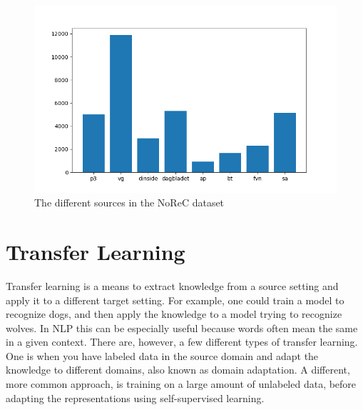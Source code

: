 \documentclass{report}
\begin{document}
\begin{figure}[h!]
	\centering
	\includegraphics[scale=0.5]{img/src_dist}
	\caption{The different sources in the NoReC dataset}
	\label{fig:sources}
\end{figure}%



\section{Transfer Learning}
Transfer learning is a means to extract knowledge from a source setting and apply it to a different target setting. For example, one could train a model to recognize dogs, and then apply the knowledge to a model trying to recognize wolves. In NLP this can be especially useful because words often mean the same in a given context. There are, however, a few different types of transfer learning. One is when you have labeled data in the source domain and adapt the knowledge to different domains, also known as domain adaptation. A different, more common approach, is training on a large amount of unlabeled data, before adapting the representations using self-supervised learning.
\end{document}
